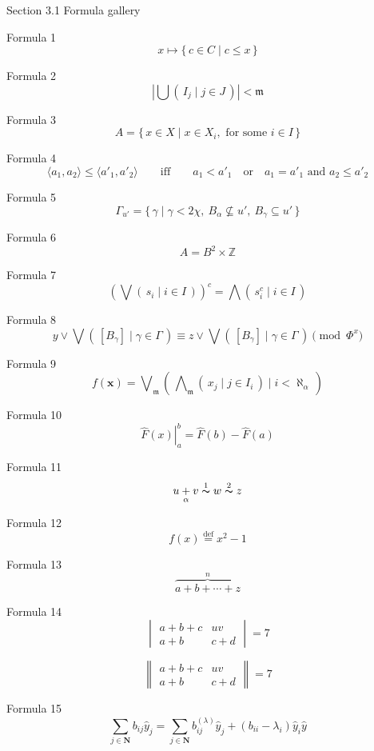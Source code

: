\documentclass{article}
\begin{document}
Section 3.1 Formula gallery

Formula 1
\[
   x \mapsto \{\, c \in C \mid c \leq x \,\}
\]

Formula 2
\[
   \left| \bigcup (\, I_{j} \mid j \in J \,) \right|
    < \mathfrak{m}
\]

Formula 3
\[
   A = \{\, x \in X \mid x \in X_{i},
         \mbox{ for some } i \in I \,\}
\]

Formula 4
\[
   \langle a_{1}, a_{2} \rangle \leq \langle a'_{1}, a'_{2}\rangle
    \qquad \mbox{if{f}} \qquad a_{1} < a'_{1} \quad  \mbox{or}
    \quad a_{1} = a'_{1} \mbox{ and } a_{2} \leq a'_{2}
\]

Formula 5
\[
   \Gamma_{u'} = \{\, \gamma \mid \gamma < 2\chi,
    \ B_{\alpha} \nsubseteq u', \ B_{\gamma} \subseteq u' \,\}
\]

Formula 6
\[
   A = B^{2} \times \mathbb{Z}
\]

Formula 7
\[
   \left( \bigvee (\, s_{i} \mid i \in I \,) \right)^{c} =
    \bigwedge (\, s_{i}^{c} \mid i \in I \,)
\]

Formula 8
\[
   y \vee \bigvee (\, [B_{\gamma}] \mid \gamma
    \in \Gamma \,) \equiv z \vee \bigvee (\, [B_{\gamma}]
    \mid \gamma \in \Gamma \,) \pmod{ \Phi^{x} }
\]

Formula 9
\[
   f(\mathbf{x}) = \bigvee\nolimits_{\!\mathfrak{m}}
    \left(\,
       \bigwedge\nolimits_{\mathfrak{m}}
       (\, x_{j} \mid j \in I_{i} \,) \mid i < \aleph_{\alpha}
    \,\right)
\]

Formula 10
\[
   \left. \widehat{F}(x) \right|_{a}^{b} =
      \widehat{F}(b) - \widehat{F}(a)
\]

Formula 11
\[
  u \underset{\alpha}{+} v \overset{1}{\thicksim} w
    \overset{2}{\thicksim} z
\]

Formula 12
\[
   f(x) \overset{ \text{def} }{=} x^{2} - 1
\]

Formula 13
\[
   \overbrace{a + b + \cdots + z}^{n}
\]

Formula 14
\[
   \begin{vmatrix}
      a + b + c & uv\\
      a + b & c + d
   \end{vmatrix}
   = 7
\]

\[
   \begin{Vmatrix}
      a + b + c & uv\\
      a + b & c + d
   \end{Vmatrix}
   = 7
\]

Formula 15
\[
   \sum_{j \in \mathbf{N}} b_{ij} \hat{y}_{j} =
   \sum_{j \in \mathbf{N}} b^{(\lambda)}_{ij} \hat{y}_{j} +
   (b_{ii} - \lambda_{i}) \hat{y}_{i} \hat{y}
\]
\end{document}
